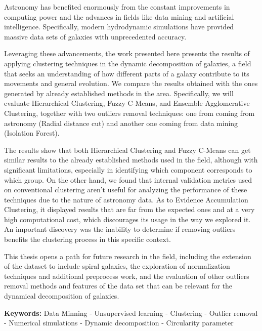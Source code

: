 Astronomy has benefited enormously from the constant improvements in computing power and the advances in fields like data mining and artificial intelligence. Specifically, modern hydrodynamic simulations have provided massive data sets of galaxies with unprecedented accuracy.

Leveraging these advancements, the work presented here presents the results of applying clustering techniques in the dynamic decomposition of galaxies, a field that seeks an understanding of how different parts of a galaxy contribute to its movements and general evolution. We compare the results obtained with the ones generated by already established methods in the area. Specifically, we will evaluate Hierarchical Clustering, Fuzzy C-Means, and Ensemble Agglomerative Clustering, together with two outliers removal techniques: one from coming from astronomy (Radial distance cut) and another one coming from data mining (Isolation Forest).

The results show that both Hierarchical Clustering and Fuzzy C-Means can get similar results to the already established methods used in the field, although with significant limitations, especially in identifying which component corresponds to which group. On the other hand, we found that internal validation metrics used on conventional clustering aren't useful for analyzing the performance of these techniques due to the nature of astronomy data. As to Evidence Accumulation Clustering, it displayed results that are far from the expected ones and at a very high computational cost, which discourages its usage in the way we explored it. An important discovery was the inability to determine if removing outliers benefits the clustering process in this specific context.

This thesis opens a path for future research in the field, including the extension of the dataset to include spiral galaxies, the exploration of normalization techniques and additional preprocess work, and the evaluation of other outliers removal methods and features of the data set that can be relevant for the dynamical decomposition of galaxies.

\vfill

\textbf{Keywords:} Data Minning - Unsupervised learning - Clustering - Outlier removal - Numerical simulations - Dynamic decomposition - Circularity parameter